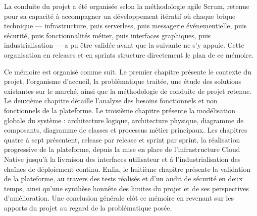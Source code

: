 La conduite du projet a été organisée selon la méthodologie agile Scrum, retenue pour sa capacité à accompagner un développement itératif où chaque brique technique — infrastructure, puis serverless, puis messagerie événementielle, puis sécurité, puis fonctionnalités métier, puis interfaces graphiques, puis industrialisation — a pu être validée avant que la suivante ne s'y appuie. Cette organisation en releases et en sprints structure directement le plan de ce mémoire.

Ce mémoire est organisé comme suit. Le premier chapitre présente le contexte du projet, l'organisme d'accueil, la problématique traitée, une étude des solutions existantes sur le marché, ainsi que la méthodologie de conduite de projet retenue. Le deuxième chapitre détaille l'analyse des besoins fonctionnels et non fonctionnels de la plateforme. Le troisième chapitre présente la modélisation globale du système : architecture logique, architecture physique, diagramme de composants, diagramme de classes et processus métier principaux. Les chapitres quatre à sept présentent, release par release et sprint par sprint, la réalisation progressive de la plateforme, depuis la mise en place de l'infrastructure Cloud Native jusqu'à la livraison des interfaces utilisateur et à l'industrialisation des chaînes de déploiement continu. Enfin, le huitième chapitre présente la validation de la plateforme, au travers des tests réalisés et d'un audit de sécurité en deux temps, ainsi qu'une synthèse honnête des limites du projet et de ses perspectives d'amélioration. Une conclusion générale clôt ce mémoire en revenant sur les apports du projet au regard de la problématique posée.
